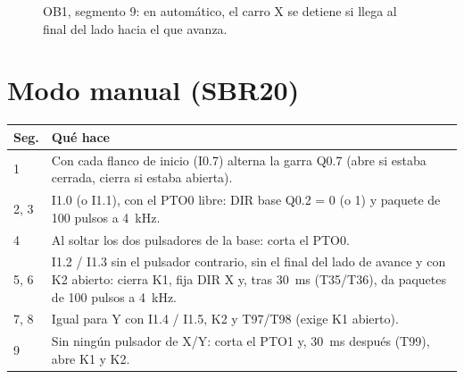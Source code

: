\begin{figure}[H]
\centering
{}
\caption{OB1, segmento 9: en automático, el carro X se detiene si llega al final del lado hacia el que avanza.}
\end{figure}

\section{Modo manual (SBR20)}
\begin{center}\small
\begin{longtable}{>{\raggedright}p{1.2cm} >{\raggedright\arraybackslash}p{13.8cm}}
\toprule
\textbf{Seg.} & \textbf{Qué hace}\\
\midrule
\endhead
1 & Con cada flanco de inicio (I0.7) alterna la garra Q0.7 (abre si estaba cerrada, cierra si estaba abierta).\\
2, 3 & I1.0 (o I1.1), con el PTO0 libre: DIR base Q0.2 = 0 (o 1) y paquete de 100 pulsos a 4~kHz.\\
4 & Al soltar los dos pulsadores de la base: corta el PTO0.\\
5, 6 & I1.2 / I1.3 sin el pulsador contrario, sin el final del lado de avance y con K2 abierto: cierra K1, fija DIR X y, tras 30~ms (T35/T36), da paquetes de 100 pulsos a 4~kHz.\\
7, 8 & Igual para Y con I1.4 / I1.5, K2 y T97/T98 (exige K1 abierto).\\
9 & Sin ningún pulsador de X/Y: corta el PTO1 y, 30~ms después (T99), abre K1 y K2.\\
\bottomrule
\end{longtable}
\end{center}

